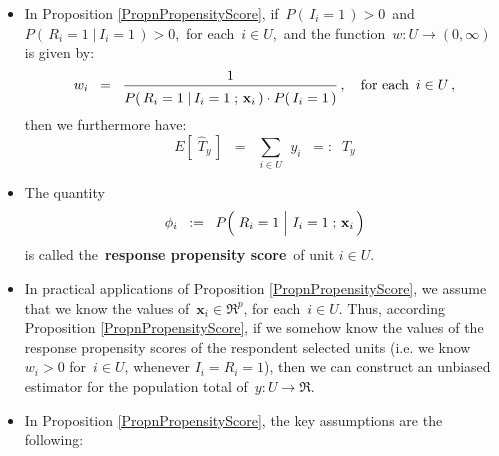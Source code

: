\begin{remark}
\mbox{}\vskip 0.05cm
\begin{itemize}
\item
	In Proposition \ref{PropnPropensityScore},
	if \,$P(\,I_{i}=1\,) >0$\, and \,$P(\,R_{i}=1\;\vert\,I_{i}=1\,) > 0$,\,
	for each \,$i \in U$,\, and the function \,$w : U \longrightarrow (0,\infty)$\, is given by:
	\begin{equation*}
	w_{i}
	\;\; = \;\;
		\dfrac{1}{\overset{{\color{white}.}}{P}(\,R_{i}=1\;\vert\,I_{i}=1\;;\,\mathbf{x}_{i}\,)
		\cdot P(\,I_{i}=1\,)}\,,
	\quad
	\textnormal{for each \,$i \in U$}\,,
	\end{equation*}
	then we furthermore have:
	\begin{equation*}
	E\!\left[\;\widehat{T}_{y}\,\right]
	\;\; = \;\;
		\underset{i \in U}{\sum}\;\,y_{i}
	\;\; =: \;\;
		T_{y}
	\end{equation*}
\item
	The quantity
	\begin{equation*}
	\phi_{i}
	\;\; := \;\;
		P\!\left(\,\left.R_{i}\overset{{\color{white}-}}{=}1\;\right\vert\,I_{i}=1\;;\,\mathbf{x}_{i}\,\right)
	\end{equation*}
	is called the \,\textbf{response propensity score}\, of unit $i \in U$.
\item
	In practical applications of Proposition \ref{PropnPropensityScore}, we assume
	that we know the values of \,$\mathbf{x}_{i} \in \Re^{p}$, for each \,$i \in U$.
	Thus, according Proposition \ref{PropnPropensityScore}, if we somehow
	know the values of the response propensity scores of the respondent selected units
	(i.e. we know \,$w_{i} > 0$ for \,$i \in U$, whenever $I_{i} = R_{i} = 1$),
	then we can construct an unbiased estimator for the population total of
	\,$y : U \longrightarrow \Re$.
\item
	In Proposition \ref{PropnPropensityScore}, the key assumptions are the following:
\end{itemize}
\end{remark}
